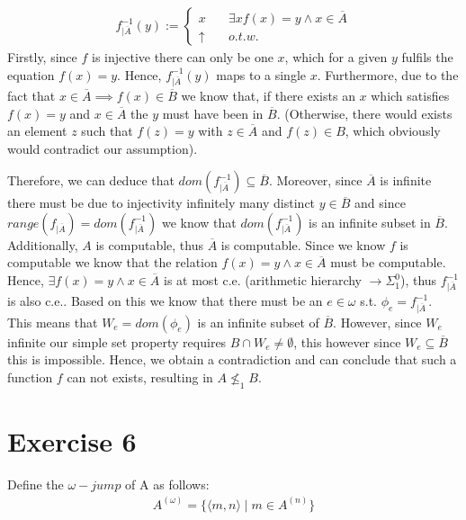 \documentclass[11pt,a4paper]{article}
\begin{document}
\begin{equation*}
\begin{split}
f_{|\overline{A}}^{-1}(y):= 
\begin{cases}
x & \quad \exists x f(x)=y \wedge x \in \overline{A} \\
\uparrow & \quad o.t.w.
\end{cases}
\end{split}
\end{equation*}
Firstly, since $f$ is injective there can only be one $x$, which for a given $y$  fulfils the equation $f(x)=y$.
Hence, $f_{|\overline{A}}^{-1}(y)$ maps to a single $x$.
Furthermore, due to the fact that $x \in \overline{A}  \implies f(x) \in \overline{B}$ we know that, if there exists an $x$ which satisfies
$f(x)=y$ and $x \in \overline{A}$ the $y$ must have been in $\overline{B}$. (Otherwise, there would exists an element $z$ such that 
$f(z)=y$ with $z \in \overline{A}$ and $f(z) \in B$, which obviously would contradict our assumption).

Therefore, we can deduce that $dom(f_{|\overline{A}}^{-1}) \subseteq \overline{B}$. Moreover, since  $\overline{A}$ is infinite 
there must be due to injectivity infinitely many distinct $y \in \overline{B}$ and since $range(f_{|\overline{A}})=dom(f_{|\overline{A}}^{-1})$ we know that $dom(f_{|\overline{A}}^{-1})$ is an infinite subset in $\overline{B}$. 
Additionally, $A$ is computable, thus $\overline{A}$ is computable. Since we know $f$ is computable we know that the relation
$f(x)=y \wedge x \in \overline{A}$ must be computable. Hence, $\exists f(x)=y \wedge x \in \overline{A}$ is at most c.e. (arithmetic hierarchy $\rightarrow \Sigma_1^0$), thus $f_{|\overline{A}}^{-1}$ is also c.e.. Based on this we know that there must be an $e \in \omega$ s.t. $\phi_e=f_{|\overline{A}}^{-1}$. This means that $W_e=dom(\phi_e)$ is an infinite subset of $\overline{B}$. 
However, since $W_e$ infinite our simple set property requires $B \cap W_e \neq \emptyset$, this however since $W_e \subseteq \overline{B}$ this is impossible. 
Hence, we obtain a contradiction and can conclude that such a function $f$ can not exists, resulting in $A \nleq_1 B$.




\section*{Exercise 6}

Define the $\omega-jump$ of A as follows:
\begin{equation*}
\begin{split}
A^{(\omega)} =\{\langle m,n \rangle \mid m \in A^{(n)}\}
\end{split}
\end{equation*}
\end{document}
